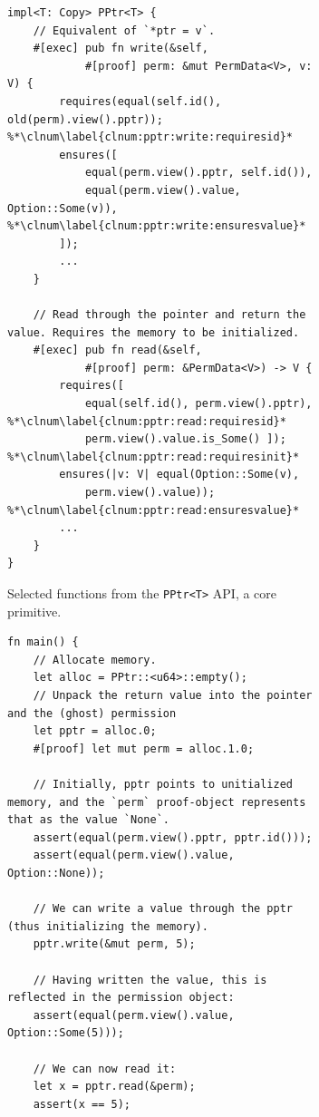 \begin{figure}

\begin{subfigure}[c]{.46\textwidth}


\begin{lstlisting}[language=Verus,style=VerusLineNos]
impl<T: Copy> PPtr<T> {
    // Equivalent of `*ptr = v`.
    #[exec] pub fn write(&self,
            #[proof] perm: &mut PermData<V>, v: V) {
        requires(equal(self.id(), old(perm).view().pptr)); %*\clnum\label{clnum:pptr:write:requiresid}*
        ensures([
            equal(perm.view().pptr, self.id()),
            equal(perm.view().value, Option::Some(v)), %*\clnum\label{clnum:pptr:write:ensuresvalue}*
        ]);
        ...
    }

    // Read through the pointer and return the value. Requires the memory to be initialized.
    #[exec] pub fn read(&self,
            #[proof] perm: &PermData<V>) -> V {
        requires([
            equal(self.id(), perm.view().pptr), %*\clnum\label{clnum:pptr:read:requiresid}*
            perm.view().value.is_Some() ]); %*\clnum\label{clnum:pptr:read:requiresinit}*
        ensures(|v: V| equal(Option::Some(v),
            perm.view().value)); %*\clnum\label{clnum:pptr:read:ensuresvalue}*
        ...
    }
}
\end{lstlisting}
\caption{Selected functions from the \texttt{PPtr<T>} API, a core \verus primitive.} \label{fig:pptr:api}
\end{subfigure}
\hfill
\begin{subfigure}[c]{.50\textwidth}


\begin{lstlisting}[language=Verus,style=VerusLineNos]
fn main() {
    // Allocate memory.
    let alloc = PPtr::<u64>::empty();
    // Unpack the return value into the pointer and the (ghost) permission
    let pptr = alloc.0;
    #[proof] let mut perm = alloc.1.0;

    // Initially, pptr points to unitialized memory, and the `perm` proof-object represents that as the value `None`.
    assert(equal(perm.view().pptr, pptr.id()));
    assert(equal(perm.view().value, Option::None));

    // We can write a value through the pptr (thus initializing the memory).
    pptr.write(&mut perm, 5); 

    // Having written the value, this is reflected in the permission object:
    assert(equal(perm.view().value, Option::Some(5)));

    // We can now read it:
    let x = pptr.read(&perm); 
    assert(x == 5);


\end{lstlisting}
\end{subfigure}
\end{figure}
